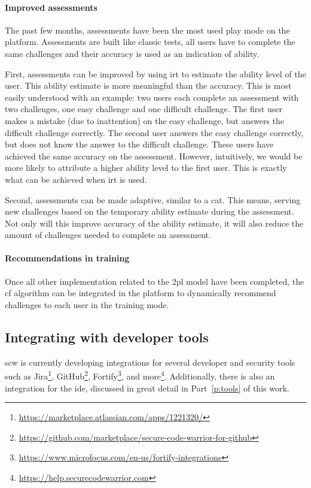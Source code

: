 \paragraph{Improved assessments}
The past few months, assessments have been the most used play mode on the platform.
Assessments are built like classic tests, all users have to complete the same challenges and their accuracy is used as an indication of ability.

First, assessments can be improved by using \gls{irt} to estimate the ability level of the user.
This ability estimate is more meaningful than the accuracy.
This is most easily understood with an example: two users each complete an assessment with two challenges, one easy challenge and one difficult challenge.
The first user makes a mistake (due to inattention) on the easy challenge, but answers the difficult challenge correctly.
The second user answers the easy challenge correctly, but does not know the answer to the difficult challenge.
These users have achieved the same accuracy on the assessment.
However, intuitively, we would be more likely to attribute a higher ability level to the first user.
This is exactly what can be achieved when \gls{irt} is used.

Second, assessments can be made adaptive, similar to a \gls{cat}.
This means, serving new challenges based on the temporary ability estimate during the assessment.
Not only will this improve accuracy of the ability estimate, it will also reduce the amount of challenges needed to complete an assessment.

\paragraph{Recommendations in training}
Once all other implementation related to the \gls{2pl} model have been completed, the \gls{cf} algorithm can be integrated in the platform to dynamically recommend challenges to each user in the training mode.

\subsection{Integrating with developer tools}
\label{sec:its-integration}
\Gls{scw} is currently developing integrations for several developer and security tools such as Jira\footnote{\url{https://marketplace.atlassian.com/apps/1221320/}}, GitHub\footnote{\url{https://github.com/marketplace/secure-code-warrior-for-github}}, Fortify\footnote{\url{https://www.microfocus.com/en-us/fortify-integrations}}, and more\footnote{\url{https://help.securecodewarrior.com}}.
Additionally, there is also an integration for the \gls{ide}, discussed in great detail in Part~\ref{p:tools} of this work.

